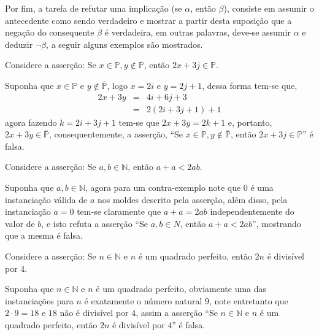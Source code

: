 Por fim, a tarefa de refutar uma implicação (se $\alpha$, então $\beta$), consiste em assumir o antecedente como sendo verdadeiro e mostrar a partir desta suposição que a negação do consequente $\beta$ é verdadeira, em outras palavras, deve-se assumir $\alpha$ e deduzir $\neg \beta$, a seguir alguns exemplos são mostrados.

\begin{exemplo}\label{exe:Refutacao6}
	Considere a asserção: Se $x\in \mathbb{P}, y \notin \overline{\mathbb{P}}$, então $2x + 3j \in \mathbb{P}$.
	
	\begin{refute}
		Suponha que $x\in \mathbb{P}$ e $y \notin \overline{\mathbb{P}}$, logo $x = 2i$ e $y = 2j + 1$, dessa forma tem-se que,
		\begin{eqnarray*}
			2x + 3y & = & 4i + 6j + 3\\
			& = & 2(2i + 3j + 1) + 1
		\end{eqnarray*}
		agora fazendo $k = 2i + 3j + 1$ tem-se que $2x + 3y = 2k + 1$ e, portanto, $2x + 3y \in \overline{\mathbb{P}}$, consequentemente, a asserção, ``Se $x\in \mathbb{P}, y \notin \overline{\mathbb{P}}$, então $2x + 3j \in \mathbb{P}$'' é falsa.
	\end{refute} 
\end{exemplo}

\begin{exemplo}\label{exe:Refutacao7}
	Considere a asserção: Se $a, b \in \mathbb{N}$, então $a + a < 2ab$.
	
	\begin{refute}
		Suponha que $a, b \in \mathbb{N}$, agora para um contra-exemplo note que $0$ é uma instanciação válida de $a$ nos moldes descrito pela asserção, além disso, pela instanciação $a = 0$ tem-se claramente que $a + a = 2ab$ independentemente do valor de $b$, e isto refuta a asserção ``Se $a, b \in {N}$, então $a + a < 2ab$'', mostrando que a mesma é falsa.
	\end{refute} 
\end{exemplo}

\begin{exemplo}\label{exe:Refutacao8}
	Considere a asserção: Se $n \in \mathbb{N}$ e $n$ é um quadrado perfeito, então $2n$ é divisível por $4$.
	
	\begin{refute}
		Suponha que $n \in \mathbb{N}$ e $n$ é um quadrado perfeito, obviamente uma das instanciações para $n$ é exatamente o número natural $9$, note entretanto que $2 \cdot 9 = 18$ e $18$ não é divisível por $4$, assim a asserção ``Se $n \in \mathbb{N}$ e $n$ é um quadrado perfeito, então $2n$ é divisível por $4$'' é falsa.
	\end{refute} 
\end{exemplo}

